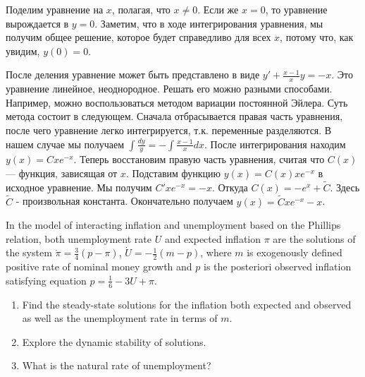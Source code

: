 \begin{solution}
Поделим уравнение на $x$, полагая, что $x\neq 0$. Если же $x=0$, то уравнение вырождается в $y=0$. Заметим, что в ходе интегрирования уравнения, мы получим общее решение, которое будет справедливо для всех $x$, потому что, как увидим, $y(0)=0$. 

После деления уравнение может быть представлено в виде $y'+\frac{x-1}{x} y=-x$. Это уравнение линейное, неоднородное. Решать его можно разными способами. Например, можно воспользоваться методом вариации постоянной Эйлера. Суть метода состоит в следующем. Сначала отбрасывается правая часть уравнения, после чего уравнение легко интегрируется, т.к. переменные разделяются. В нашем случае мы получаем $\int \frac{dy}{y} =-\int \frac{x-1}{x} dx  $. После интегрирования находим $y(x)=Cxe^{-x} $. Теперь восстановим правую часть уравнения, считая что $C(x)$ --- функция, зависящая от $x$. Подставим функцию $y(x)=C(x)xe^{-x} $ в исходное уравнение. Мы получим $C'xe^{-x} =-x$. Откуда $C(x)=-e^{x} +\tilde{C}$. Здесь $\tilde{C}$ - произвольная константа. Окончательно получаем $y(x)=\tilde{C}xe^{-x} -x$.
\end{solution}


\begin{problem}
 In the model of interacting inflation and unemployment based on the Phillips relation,  both unemployment rate $U$ and expected inflation $\pi$ are the solutions of the system $\dot{\pi}=\frac{3}{4}(p-\pi)$, $\dot{U}=-\frac{1}{2}(m-p)$, where $m$ is exogenously defined positive rate of nominal money growth and $p$ is the posteriori observed inflation satisfying equation $p=\frac{1}{6}-3U+\pi$. 
\begin{enumerate}
\item Find the steady-state solutions for the inflation both expected and observed as well as the unemployment rate in terms of $m$. 
\item Explore the dynamic stability of solutions. 
\item What is the natural rate of unemployment?
\end{enumerate} 
\end{problem}



